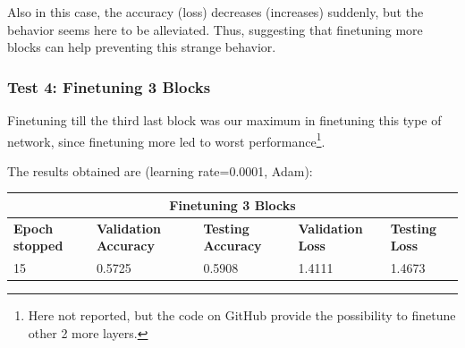 Also in this case, the accuracy (loss) decreases (increases) suddenly, but the behavior seems here to be alleviated. Thus, suggesting that finetuning more blocks can help preventing this strange behavior.


\subsubsection{Test 4: Finetuning 3 Blocks}
Finetuning till the third last block was our maximum in finetuning this type of network, since finetuning more led to worst performance\footnote{Here not reported, but the code on GitHub provide the possibility to finetune other 2 more layers.}.

\noindent The results obtained are (learning rate=0.0001, Adam):

\medskip

\begin{tabular}{ |p{2cm}|p{2cm}|p{2cm}|p{2cm}|p{2cm}|  }
\hline
\multicolumn{5}{|c|}{Finetuning 3 Blocks} \\
\hline
\textbf{Epoch stopped} & \textbf{Validation Accuracy} & \textbf{Testing Accuracy} & \textbf{Validation Loss} & \textbf{Testing Loss} \\
\hline
15 & 0.5725 & 0.5908 & 1.4111 & 1.4673\\
\hline
\end{tabular}

